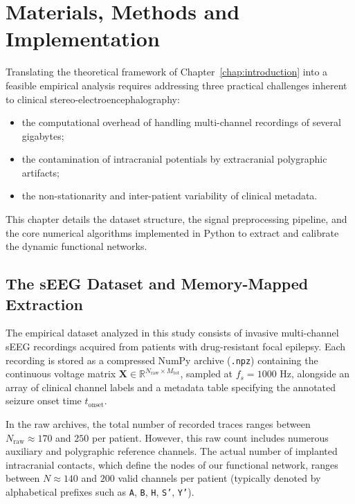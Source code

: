 \chapter[Materials, Methods and Implementation]{Materials, Methods and \\ Implementation}
\label{chap:methods}

Translating the theoretical framework of Chapter~\ref{chap:introduction} into a feasible empirical analysis requires addressing three practical challenges inherent to clinical stereo-electroencephalography:
\begin{itemize}
    \item the computational overhead of handling multi-channel recordings of several gigabytes;
    \item the contamination of intracranial potentials by extracranial polygraphic artifacts;
    \item the non-stationarity and inter-patient variability of clinical metadata.
\end{itemize}
This chapter details the dataset structure, the signal preprocessing pipeline, and the core numerical algorithms implemented in Python to extract and calibrate the dynamic functional networks.

\section{The sEEG Dataset and Memory-Mapped Extraction}
\label{sec:dataset_extraction}

The empirical dataset analyzed in this study consists of invasive multi-channel sEEG recordings acquired from patients with drug-resistant focal epilepsy. Each recording is stored as a compressed NumPy archive (\texttt{.npz}) containing the continuous voltage matrix $\mathbf{X} \in \mathbb{R}^{N_{\text{raw}} \times M_{\text{tot}}}$, sampled at $f_s = 1000\text{ Hz}$, alongside an array of clinical channel labels and a metadata table specifying the annotated seizure onset time $t_{\text{onset}}$.

In the raw archives, the total number of recorded traces ranges between $N_{\text{raw}} \approx 170$ and $250$ per patient. However, this raw count includes numerous auxiliary and polygraphic reference channels. The actual number of implanted intracranial contacts, which define the nodes of our functional network, ranges between $N \approx 140$ and $200$ valid channels per patient (typically denoted by alphabetical prefixes such as \texttt{A}, \texttt{B}, \texttt{H}, \texttt{S'}, \texttt{Y'}).

